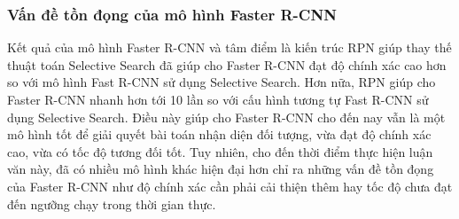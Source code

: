 {    %


    \subsubsection*{Vấn đề tồn đọng của mô hình Faster R-CNN}
    Kết quả của mô hình Faster R-CNN và tâm điểm là kiến trúc RPN giúp thay thế thuật toán Selective Search đã giúp cho Faster R-CNN đạt độ chính xác cao hơn so với mô hình Fast R-CNN sử dụng Selective Search.
    Hơn nữa, RPN giúp cho Faster R-CNN nhanh hơn tới 10 lần so với cấu hình tương tự Fast R-CNN sử dụng Selective Search.
    Điều này giúp cho Faster R-CNN cho đến nay vẫn là một mô hình tốt để giải quyết bài toán nhận diện đối tượng, vừa đạt độ chính xác cao, vừa có tốc độ tương đối tốt.
    Tuy nhiên, cho đến thời điểm thực hiện luận văn này, đã có nhiều mô hình khác hiện đại hơn chỉ ra những vấn đề tồn đọng của Faster R-CNN như độ chính xác cần phải cải thiện thêm hay tốc độ chưa đạt đến ngưỡng chạy trong thời gian thực. 
}